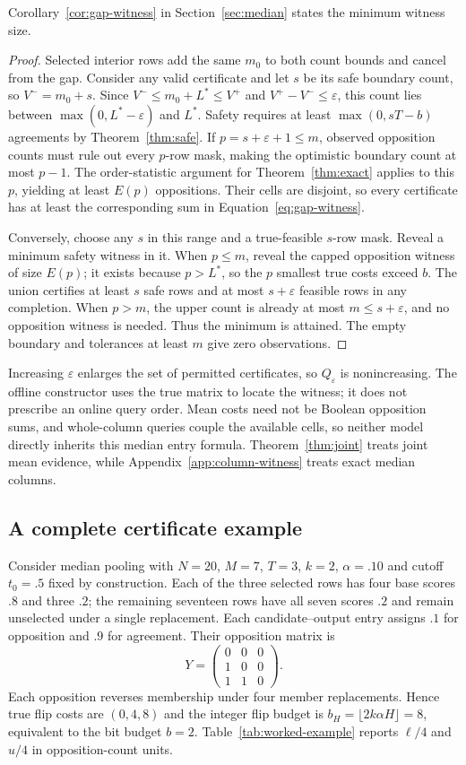 Corollary~\ref{cor:gap-witness} in Section~\ref{sec:median} states the minimum witness size.

\begin{proof}
Selected interior rows add the same $m_0$ to both count bounds and cancel from the gap. Consider any valid certificate and let $s$ be its safe boundary count, so $V^-=m_0+s$. Since $V^-\le m_0+L^*\le V^+$ and $V^+-V^-\le\varepsilon$, this count lies between $\max(0,L^*-\varepsilon)$ and $L^*$. Safety requires at least $\max(0,sT-b)$ agreements by Theorem~\ref{thm:safe}. If $p=s+\varepsilon+1\le m$, observed opposition counts must rule out every $p$-row mask, making the optimistic boundary count at most $p-1$. The order-statistic argument for Theorem~\ref{thm:exact} applies to this $p$, yielding at least $E(p)$ oppositions. Their cells are disjoint, so every certificate has at least the corresponding sum in Equation~\ref{eq:gap-witness}.

Conversely, choose any $s$ in this range and a true-feasible $s$-row mask. Reveal a minimum safety witness in it. When $p\le m$, reveal the capped opposition witness of size $E(p)$; it exists because $p>L^*$, so the $p$ smallest true costs exceed $b$. The union certifies at least $s$ safe rows and at most $s+\varepsilon$ feasible rows in any completion. When $p>m$, the upper count is already at most $m\le s+\varepsilon$, and no opposition witness is needed. Thus the minimum is attained. The empty boundary and tolerances at least $m$ give zero observations.
\end{proof}

Increasing $\varepsilon$ enlarges the set of permitted certificates, so $Q_\varepsilon$ is nonincreasing. The offline constructor uses the true matrix to locate the witness; it does not prescribe an online query order. Mean costs need not be Boolean opposition sums, and whole-column queries couple the available cells, so neither model directly inherits this median entry formula. Theorem~\ref{thm:joint} treats joint mean evidence, while Appendix~\ref{app:column-witness} treats exact median columns.

\subsection{A complete certificate example}
\label{app:worked-example}
Consider median pooling with $N=20$, $M=7$, $T=3$, $k=2$, $\alpha=.10$ and cutoff $t_0=.5$ fixed by construction. Each of the three selected rows has four base scores $.8$ and three $.2$; the remaining seventeen rows have all seven scores $.2$ and remain unselected under a single replacement. Each candidate--output entry assigns $.1$ for opposition and $.9$ for agreement. Their opposition matrix is
\[
 Y=\begin{pmatrix}0&0&0\\1&0&0\\1&1&0\end{pmatrix}.
\]
Each opposition reverses membership under four member replacements. Hence true flip costs are $(0,4,8)$ and the integer flip budget is $b_H=\lfloor2k\alpha H\rfloor=8$, equivalent to the bit budget $b=2$. Table~\ref{tab:worked-example} reports $\ell/4$ and $u/4$ in opposition-count units.

